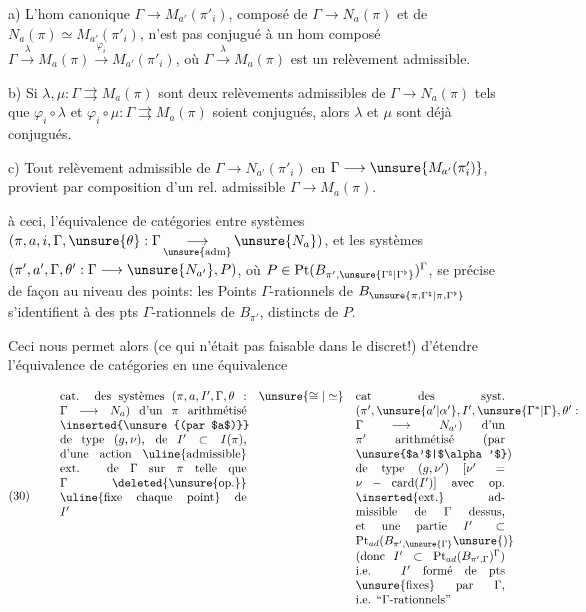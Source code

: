 a) L'hom canonique $\Gamma\longrightarrow M_{a'}(\pi'_i)$,
composé de $\Gamma\longrightarrow N_a(\pi)$ et de
$N_a(\pi)\simeq M_{a'}(\pi'_i)$,
n'est pas conjugué à un hom composé
$\Gamma\xrightarrow{\lambda}M_a(\pi)
\xrightarrow{\varphi_i}M_{a'}(\pi'_i)$,
où $\Gamma\xrightarrow{\lambda}M_a(\pi)$ est un relèvement admissible.

b) Si $\lambda,\mu:\Gamma\rightrightarrows M_a(\pi)$ sont deux
relèvements admissibles de $\Gamma\longrightarrow N_a(\pi)$
 tels que
$\varphi_i\circ\lambda$ et $\varphi_i\circ\mu:
\Gamma\rightrightarrows M_a(\pi)$ soient
conjugués, alors $\lambda$ et $\mu$ sont déjà
\inserted{$\pi$-}conjugués.

c) Tout relèvement admissible de
$\Gamma\longrightarrow N_{a'}(\pi'_i)$ en
$\Gamma\longrightarrow \unsure{M_{a'}(\pi'_i)}$,
provient par composition d'un rel. admissible
$\Gamma\longrightarrow M_a(\pi)$.


 à ceci, l'équivalence de catégories entre systèmes
$(\pi,a,i,\Gamma,\unsure{\theta}:\Gamma\mathop{\longrightarrow}\limits_{\unsure{\mathrm{adm}}}\unsure{N_a})$,
et les systèmes $(\pi',a',\Gamma,\theta':\Gamma\longrightarrow\unsure{N_{a'}},P)$,
où $P\in\mathrm{Pt}(B_{\pi',\unsure{\Gamma^{\natural}|\Gamma^{\flat}}})^\Gamma$,
se précise de façon  au niveau des points: les
Points $\Gamma$-rationnels de $B_{\unsure{\pi,\Gamma^{\natural}|\pi,\Gamma^{\flat}}}$
s'identifient à 
 des pts $\Gamma$-rationnels
de $B_{\pi'}$, distincts de $P$.

Ceci nous permet alors (ce qui n'était pas faisable dans le 
discret!) d'étendre l'équivalence de catégories en une équivalence

\[
(30)\qquad
\begin{array}{c@{\quad}c@{\quad}c}
\parbox[t]{0.45\linewidth}{%
cat. des systèmes $(\pi,a,I',\Gamma,\theta:\Gamma\longrightarrow N_a)$
d'un $\pi$ arithmétisé \inserted{\unsure{(par $a$)}} de type $(g,\nu)$,
de $I'\subset I(\pi)$, d'une action
\uline{admissible} ext. de $\Gamma$ sur $\pi$
telle que $\Gamma$ \deleted{\unsure{op.}} \uline{fixe chaque point} de $I'$
}
& \unsure{\cong|\simeq} &
\parbox[t]{0.36\linewidth}{%
cat des syst.
$(\pi',\unsure{a'|\alpha'},I',\unsure{\Gamma^{*}|\Gamma},\theta':\Gamma\longrightarrow N_{a'})$
d'un $\pi'$ arithmétisé (par \unsure{$a'$|$\alpha'$}) de type
$(g,\nu')$ $[\nu'=\nu-\mathrm{card}(I')]$
avec op. \inserted{ext.} admissible de $\Gamma$ dessus, et
une partie $I'\subset\mathrm{Pt}_{ad}(B_{\pi',\unsure{\Gamma}}\unsure{)}$
(donc $I'\subset\mathrm{Pt}_{ad}(B_{\pi',\Gamma})^\Gamma$)
i.e. $I'$ formé de pts \unsure{fixes} par $\Gamma$, i.e. ``$\Gamma$-rationnels''
}
\end{array}
\]

